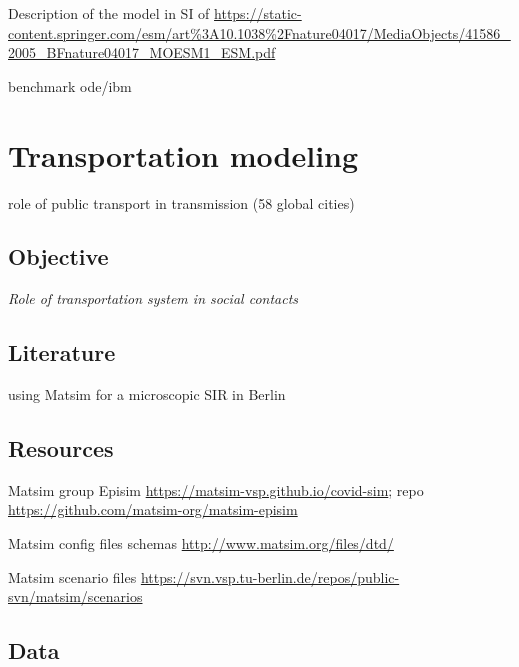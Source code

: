 \documentclass[10pt]{article}
\begin{document}
Description of the model in SI of \cite{ferguson2005strategies}
\url{https://static-content.springer.com/esm/art\%3A10.1038\%2Fnature04017/MediaObjects/41586_2005_BFnature04017_MOESM1_ESM.pdf}


\cite{adam2020simulating}

\cite{pollmann2021impact} benchmark ode/ibm


\section{Transportation modeling}


\cite{zhu2021effects} role of public transport in transmission (58 global cities)

\cite{leung2021real}

\subsection{Objective}

\textit{Role of transportation system in social contacts}

\subsection{Literature}

\cite{11303_10945} using Matsim for a microscopic SIR in Berlin

\cite{ku2021safe}

\subsection{Resources}

Matsim group Episim \url{https://matsim-vsp.github.io/covid-sim}; repo \url{https://github.com/matsim-org/matsim-episim}

Matsim config files schemas \url{http://www.matsim.org/files/dtd/}

Matsim scenario files \url{https://svn.vsp.tu-berlin.de/repos/public-svn/matsim/scenarios}
	
\subsection{Data}
\end{document}

